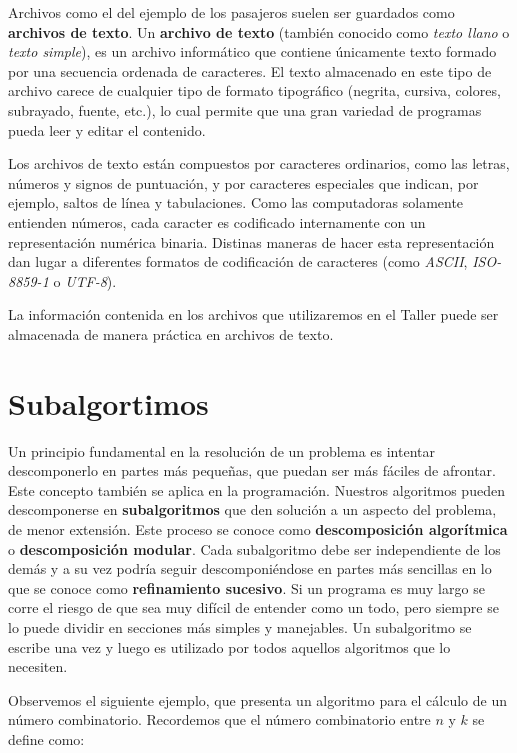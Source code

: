 \documentclass[]{book}
\begin{document}
Archivos como el del ejemplo de los pasajeros suelen ser guardados como
\textbf{archivos de texto}. Un \textbf{archivo de texto} (también
conocido como \emph{texto llano} o \emph{texto simple}), es un archivo
informático que contiene únicamente texto formado por una secuencia
ordenada de caracteres. El texto almacenado en este tipo de archivo
carece de cualquier tipo de formato tipográfico (negrita, cursiva,
colores, subrayado, fuente, etc.), lo cual permite que una gran variedad
de programas pueda leer y editar el contenido.

Los archivos de texto están compuestos por caracteres ordinarios, como
las letras, números y signos de puntuación, y por caracteres especiales
que indican, por ejemplo, saltos de línea y tabulaciones. Como las
computadoras solamente entienden números, cada caracter es codificado
internamente con un representación numérica binaria. Distinas maneras de
hacer esta representación dan lugar a diferentes formatos de
codificación de caracteres (como \emph{ASCII}, \emph{ISO-8859-1} o
\emph{UTF-8}).

La información contenida en los archivos que utilizaremos en el Taller
puede ser almacenada de manera práctica en archivos de texto.

\chapter{Subalgortimos}\label{subalgortimos}

Un principio fundamental en la resolución de un problema es intentar
descomponerlo en partes más pequeñas, que puedan ser más fáciles de
afrontar. Este concepto también se aplica en la programación. Nuestros
algoritmos pueden descomponerse en \textbf{subalgoritmos} que den
solución a un aspecto del problema, de menor extensión. Este proceso se
conoce como \textbf{descomposición algorítmica} o \textbf{descomposición
modular}. Cada subalgoritmo debe ser independiente de los demás y a su
vez podría seguir descomponiéndose en partes más sencillas en lo que se
conoce como \textbf{refinamiento sucesivo}. Si un programa es muy largo
se corre el riesgo de que sea muy difícil de entender como un todo, pero
siempre se lo puede dividir en secciones más simples y manejables. Un
subalgoritmo se escribe una vez y luego es utilizado por todos aquellos
algoritmos que lo necesiten.

Observemos el siguiente ejemplo, que presenta un algoritmo para el
cálculo de un número combinatorio. Recordemos que el número combinatorio
entre \(n\) y \(k\) se define como:
\end{document}
